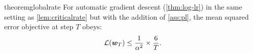 \begin{restatable}{theorem}{globalrate}\label{thm:globalrate}
For automatic gradient descent (\cref{thm:log-lr}) in the same setting as \cref{lem:criticalrate} but with the addition of \cref{ass:pl}, the mean squared error objective at step $T$ obeys:
\begin{align*}
    \mathcal{L}({\bm{w}}_T) \leq \frac{1}{\alpha^2}\times\frac{6}{T}.
\end{align*}
\end{restatable}